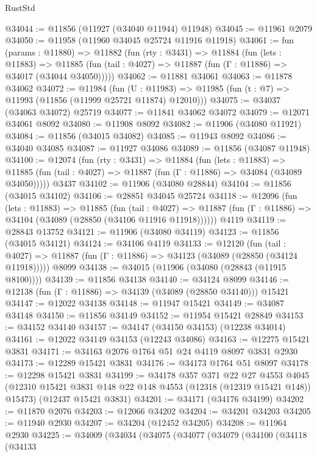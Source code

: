 \begin{lexlean}{RustStd}
\begin{coremodule}
@34044 := @11856 (@11927 (@34040 @11944) @11948)
@34045 := @11961 @2079
@34050 := @11958 (@11960 @34045 @25724 @11916 @11918)
@34061 := fun (params : @11880) =>
  @11882
    (fun (rty : @3431) =>
    @11884
      (fun (lets : @11883) =>
      @11885 (fun (tail : @4027) => @11887 (fun (Γ : @11886) => @34017 (@34044 @34050)))))
@34062 := @11881 @34061
@34063 := @11878 @34062
@34072 := @11984
    (fun (U : @11983) => @11985 (fun (t : @7) => @11993 (@11856 (@11999 @25721 @11874) @12010)))
@34075 := @34037 (@34063 @34072) @25719
@34077 := @11841 @34062 @34072
@34079 := @12071 @34061 @8092
@34080 := @11908 @8092
@34082 := @11906 (@34080 @11921)
@34084 := @11856 (@34015 @34082)
@34085 := @11943 @8092
@34086 := @34040 @34085
@34087 := @11927 @34086
@34089 := @11856 (@34087 @11948)
@34100 := @12074
    (fun (rty : @3431) =>
    @11884
      (fun (lets : @11883) =>
      @11885 (fun (tail : @4027) => @11887 (fun (Γ : @11886) => @34084 (@34089 @34050)))))
    @3437
@34102 := @11906 (@34080 @28844)
@34104 := @11856 (@34015 @34102)
@34106 := @28851 @34045 @25724
@34118 := @12096
    (fun (lets : @11883) =>
    @11885
      (fun (tail : @4027) =>
      @11887 (fun (Γ : @11886) => @34104 (@34089 (@28850 (@34106 @11916 @11918))))))
    @4119
@34119 := @28843 @13752
@34121 := @11906 (@34080 @34119)
@34123 := @11856 (@34015 @34121)
@34124 := @34106 @4119
@34133 := @12120
    (fun (tail : @4027) => @11887 (fun (Γ : @11886) => @34123 (@34089 (@28850 (@34124 @11918)))))
    @8099
@34138 := @34015 (@11906 (@34080 (@28843 (@11915 @8100))))
@34139 := @11856 @34138
@34140 := @34124 @8099
@34146 := @12138 (fun (Γ : @11886) => @34139 (@34089 (@28850 @34140))) @15421
@34147 := @12022 @34138
@34148 := @11947 @15421
@34149 := @34087 @34148
@34150 := @11856 @34149
@34152 := @11954 @15421 @28849
@34153 := @34152 @34140
@34157 := @34147 (@34150 @34153) (@12238 @34014)
@34161 := @12022 @34149 @34153 (@12243 @34086)
@34163 := @12275 @15421 @3831
@34171 := @34163 @2076 @1764 @51 @24 @4119 @8097 @3831 @2930
@34173 := @12289 @15421 @3831
@34176 := @34173 @1764 @51 @8097
@34178 := @12298 @15421 @3831
@34199 := @34178
    @357
    @371
    @22
    @27
    @4553
    @4045
    (@12310 @15421 @3831 @148 @22 @148 @4553 (@12318 (@12319 @15421 @148)) @15473)
    (@12437 @15421 @3831)
@34201 := @34171 (@34176 @34199)
@34202 := @11870 @2076
@34203 := @12066 @34202
@34204 := @34201 @34203
@34205 := @11940 @2930
@34207 := @34204 (@12452 @34205)
@34208 := @11964 @2930
@34225 := @34009
    (@34034
      (@34075
        (@34077
          (@34079
            (@34100
              (@34118
                (@34133

\end{coremodule}
\end{lexlean}
